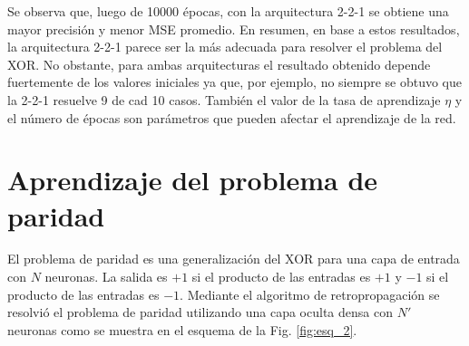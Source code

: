 \documentclass[11pt,twocolumn,twoside]{opticajnl}
\begin{document}
Se observa que, luego de 10000 épocas, con la arquitectura 2-2-1 se obtiene una mayor precisión y menor MSE promedio. En resumen, en base a estos resultados, la arquitectura 2-2-1 parece ser la más adecuada para resolver el problema del XOR. No obstante, para ambas arquitecturas el resultado obtenido depende fuertemente de los valores iniciales ya que, por ejemplo, no siempre se obtuvo que la 2-2-1 resuelve 9 de cad 10 casos. También el valor de la tasa de aprendizaje $\eta$ y el número de épocas son parámetros que pueden afectar el aprendizaje de la red.


\section{Aprendizaje del problema de paridad \label{sec:ej2}}

\vspace{0.3cm}

El problema de paridad es una generalización del XOR para una capa de entrada con $N$ neuronas. La salida es $+1$ si el producto de las entradas es $+1$ y $-1$ si el producto de las entradas es $-1$. Mediante el algoritmo de retropropagación se resolvió el problema de paridad utilizando una capa oculta densa con $N'$ neuronas como se muestra en el esquema de la Fig. \ref{fig:esq_2}. 
\end{document}
